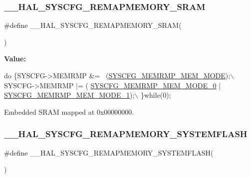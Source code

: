 \subsubsection{\texorpdfstring{\+\_\+\+\_\+\+H\+A\+L\+\_\+\+S\+Y\+S\+C\+F\+G\+\_\+\+R\+E\+M\+A\+P\+M\+E\+M\+O\+R\+Y\+\_\+\+S\+R\+AM}{\_\_HAL\_SYSCFG\_REMAPMEMORY\_SRAM}}
{\footnotesize\ttfamily \#define \+\_\+\+\_\+\+H\+A\+L\+\_\+\+S\+Y\+S\+C\+F\+G\+\_\+\+R\+E\+M\+A\+P\+M\+E\+M\+O\+R\+Y\+\_\+\+S\+R\+AM(\begin{DoxyParamCaption}{ }\end{DoxyParamCaption})}

{\bfseries Value\+:}
\begin{DoxyCode}
\textcolor{keywordflow}{do} \{SYSCFG->MEMRMP &= ~(\mbox{\hyperlink{group___peripheral___registers___bits___definition_ga3c05039ec67573c00da29f58b914f258}{SYSCFG\_MEMRMP\_MEM\_MODE}});\(\backslash\)
                                                  SYSCFG->MEMRMP |= (
      \mbox{\hyperlink{group___peripheral___registers___bits___definition_ga30d5f406535f94faea2e7f924d50201b}{SYSCFG\_MEMRMP\_MEM\_MODE\_0}} | \mbox{\hyperlink{group___peripheral___registers___bits___definition_gab5d76e8b4d801b35c31ef352b33407be}{SYSCFG\_MEMRMP\_MEM\_MODE\_1}});\(\backslash\)
                                                 \}\textcolor{keywordflow}{while}(0);
\end{DoxyCode}


Embedded S\+R\+AM mapped at 0x00000000. 

\mbox{\label{group___h_a_l___exported___macros_ga59782d94690fd538b25def536c81c3ed}} 
\subsubsection{\texorpdfstring{\+\_\+\+\_\+\+H\+A\+L\+\_\+\+S\+Y\+S\+C\+F\+G\+\_\+\+R\+E\+M\+A\+P\+M\+E\+M\+O\+R\+Y\+\_\+\+S\+Y\+S\+T\+E\+M\+F\+L\+A\+SH}{\_\_HAL\_SYSCFG\_REMAPMEMORY\_SYSTEMFLASH}}
{\footnotesize\ttfamily \#define \+\_\+\+\_\+\+H\+A\+L\+\_\+\+S\+Y\+S\+C\+F\+G\+\_\+\+R\+E\+M\+A\+P\+M\+E\+M\+O\+R\+Y\+\_\+\+S\+Y\+S\+T\+E\+M\+F\+L\+A\+SH(\begin{DoxyParamCaption}{ }\end{DoxyParamCaption})}

